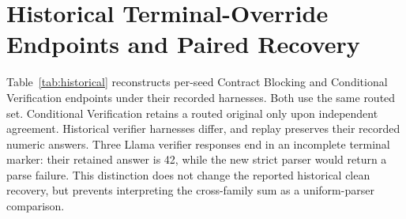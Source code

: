 \documentclass[journal,onecolumn]{IEEEtran}
\begin{document}
\section{Historical Terminal-Override Endpoints and Paired Recovery}
\label{sec:s3}
Table~\ref{tab:historical} reconstructs per-seed Contract Blocking and Conditional Verification endpoints under their recorded harnesses. Both use the same routed set. Conditional Verification retains a routed original only upon independent agreement. Historical verifier harnesses differ, and replay preserves their recorded numeric answers. Three Llama verifier responses end in an incomplete terminal marker: their retained answer is 42, while the new strict parser would return a parse failure. This distinction does not change the reported historical clean recovery, but prevents interpreting the cross-family sum as a uniform-parser comparison.
\end{document}
